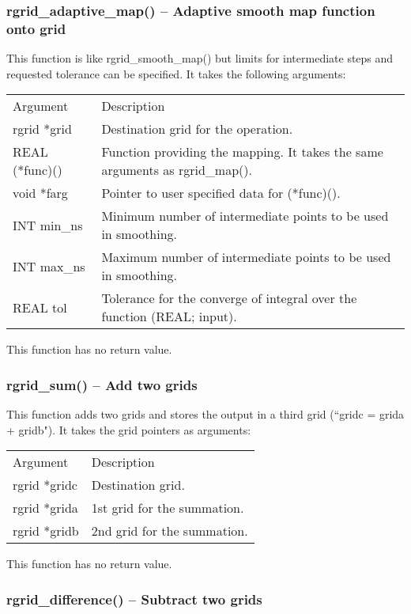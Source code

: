 \documentclass[12pt,letterpaper]{article}
\begin{document}
\subsubsection{rgrid\_adaptive\_map() -- Adaptive smooth map function onto grid}

This function is like rgrid\_smooth\_map() but limits for intermediate steps and requested tolerance can be specified. It takes the following arguments:
\begin{longtable}{p{} p{}}
Argument & Description\\
\cline{1-2}
rgrid *grid & Destination grid for the operation.\\
REAL (*func)() & Function providing the mapping. It takes the same arguments as rgrid\_map().\\
void *farg & Pointer to user specified data for (*func)().\\
INT min\_ns & Minimum number of intermediate points to be used in smoothing.\\
INT max\_ns & Maximum number of intermediate points to be used in smoothing.\\
REAL tol & Tolerance for the converge of integral over the function (REAL; input).\\
\end{longtable}
\noindent
This function has no return value.

\subsubsection{rgrid\_sum() -- Add two grids}

This function adds two grids and stores the output in a third grid (``gridc = grida + gridb"). It takes the grid pointers as arguments:
\begin{longtable}{p{} p{}}
Argument & Description\\
\cline{1-2}
rgrid *gridc & Destination grid.\\
rgrid *grida & 1st grid for the summation.\\
rgrid *gridb & 2nd grid for the summation.\\
\end{longtable}
\noindent
This function has no return value.

\subsubsection{rgrid\_difference() -- Subtract two grids}
\end{document}
